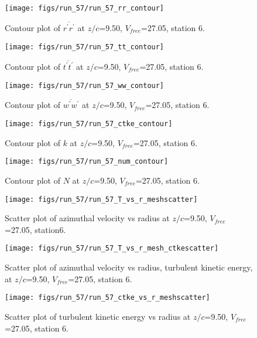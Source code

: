 \begin{figure}[H]
\centering
\texttt{[image: figs/run\_57/run\_57\_rr\_contour]}
\caption{Contour plot of $\overline{r^\prime r^\prime}$ at $z/c$=9.50, $V_{free}$=27.05, station 6.}
\label{fig:run_57_rr_contour}
\end{figure}


\begin{figure}[H]
\centering
\texttt{[image: figs/run\_57/run\_57\_tt\_contour]}
\caption{Contour plot of $\overline{t^\prime t^\prime}$ at $z/c$=9.50, $V_{free}$=27.05, station 6.}
\label{fig:run_57_tt_contour}
\end{figure}


\begin{figure}[H]
\centering
\texttt{[image: figs/run\_57/run\_57\_ww\_contour]}
\caption{Contour plot of $\overline{w^\prime w^\prime}$ at $z/c$=9.50, $V_{free}$=27.05, station 6.}
\label{fig:run_57_ww_contour}
\end{figure}


\begin{figure}[H]
\centering
\texttt{[image: figs/run\_57/run\_57\_ctke\_contour]}
\caption{Contour plot of $k$ at $z/c$=9.50, $V_{free}$=27.05, station 6.}
\label{fig:run_57_ctke_contour}
\end{figure}


\begin{figure}[H]
\centering
\texttt{[image: figs/run\_57/run\_57\_num\_contour]}
\caption{Contour plot of $N$ at $z/c$=9.50, $V_{free}$=27.05, station 6.}
\label{fig:run_57_num_contour}
\end{figure}


\begin{figure}[H]
\centering
\texttt{[image: figs/run\_57/run\_57\_T\_vs\_r\_meshscatter]}
\caption{Scatter plot of azimuthal velocity vs radius at $z/c$=9.50, $V_{free}$=27.05, station6.}
\label{fig:run_57_T_vs_r_meshscatter}
\end{figure}


\begin{figure}[H]
\centering
\texttt{[image: figs/run\_57/run\_57\_T\_vs\_r\_mesh\_ctkescatter]}
\caption{Scatter plot of azimuthal velocity vs radius, turbulent kinetic energy, at $z/c$=9.50, $V_{free}$=27.05, station 6.}
\label{fig:run_57_T_vs_r_mesh_ctkescatter}
\end{figure}


\begin{figure}[H]
\centering
\texttt{[image: figs/run\_57/run\_57\_ctke\_vs\_r\_meshscatter]}
\caption{Scatter plot of turbulent kinetic energy vs radius at $z/c$=9.50, $V_{free}$=27.05, station 6.}
\label{fig:run_57_ctke_vs_r_meshscatter}
\end{figure}


